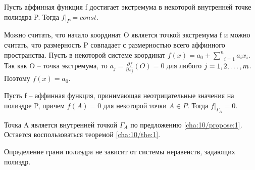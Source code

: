 \begin{theorem}[]\label{cha:10/the:1}
	Пусть аффинная функция f достигает экстремума в некоторой внутренней точке полиэдра P. Тогда $f |_P = const$.
\end{theorem}
\begin{Proof}
	Можно считать, что начало координат O является точкой экстремума f и можно считать, что размерность P совпадает с размерностью всего аффинного пространства. Пусть в некоторой системе координат $\displaystyle f(x) = a_0 + \underset{i=1}{\overset{n}{\sum}}a_i x_i$. Так как O – точка экстремума, то $\displaystyle a_j = \frac{\partial f}{\partial x_j} (O) = 0$ для любого $j = 1,2,\dots,m$. Поэтому $f(x) = a_0$.
\end{Proof}

\begin{propose}\label{cha:10/propose:2}
	Пусть f – аффинная функция, принимающая неотрицательные значения на полиэдре P, причем $f(A) = 0$ для некоторой точки $A \in P$. Тогда $f |_{\Gamma_A} = 0$.
\end{propose}
\begin{Proof}
	Точка A является внутренней точкой $\Gamma_A$ по предложению \ref{cha:10/propose:1}. Остается воспользоваться теоремой \ref{cha:10/the:1}.
\end{Proof}

\begin{conseq}[]\label{cha:10/conseq:1}
	Определение грани полиэдра не зависит от системы неравенств, задающих полиэдр.
\end{conseq}













